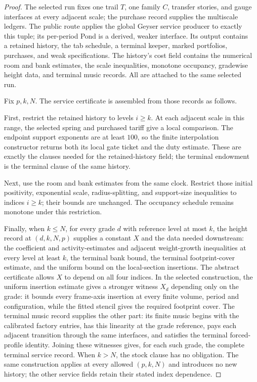 \begin{proof}
The selected run fixes one trail $T$, one family $C$, transfer stories, and gauge interfaces at every adjacent scale; the purchase record supplies the multiscale ledgers. The public route applies the global Geyser service producer to exactly this tuple; its per-period Pond is a derived, weaker interface. Its output contains a retained history, the tab schedule, a terminal keeper, marked portfolios, purchases, and weak specifications. The history's cost field contains the numerical room and bank estimates, the scale inequalities, monotone occupancy, gradewise height data, and terminal music records. All are attached to the same selected run.

Fix $p,k,N$. The service certificate is assembled from those records as follows.

First, restrict the retained history to levels $i\geq k$. At each adjacent scale in this range, the selected spring and purchased tariff give a local comparison. The endpoint support exponents are at least $100$, so the finite interpolation constructor returns both its local gate ticket and the duty estimate. These are exactly the clauses needed for the retained-history field; the terminal endowment is the terminal clause of the same history.

Next, use the room and bank estimates from the same clock. Restrict those initial positivity, exponential scale, radius-splitting, and support-size inequalities to indices $i\geq k$; their bounds are unchanged. The occupancy schedule remains monotone under this restriction.

Finally, when $k\leq N$, for every grade $d$ with reference level at most $k$, the height record at $(d,k,N,p)$ supplies a constant $X$ and the data needed downstream: the coefficient and activity-estimates and adjacent weight-growth inequalities at every level at least $k$, the terminal bank bound, the terminal footprint-cover estimate, and the uniform bound on the local-section insertions. The abstract certificate allows $X$ to depend on all four indices. In the selected construction, the uniform insertion estimate gives a stronger witness $X_d$ depending only on the grade: it bounds every frame-axis insertion at every finite volume, period and configuration, while the fitted stencil gives the required footprint cover. The terminal music record supplies the other part: its finite music begins with the calibrated factory entries, has this linearity at the grade reference, pays each adjacent transition through the same interfaces, and satisfies the terminal forced-profile identity. Joining these witnesses gives, for each such grade, the complete terminal service record. When $k>N$, the stock clause has no obligation. The same construction applies at every allowed $(p,k,N)$ and introduces no new history; the other service fields retain their stated index dependence.


\end{proof}
